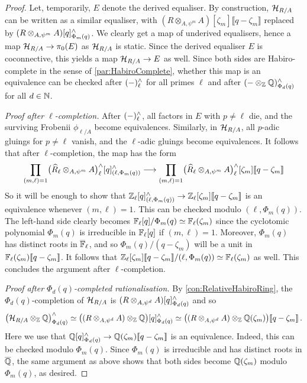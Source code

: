 \documentclass[DIV=12,numbers=enddot,leqno,bibliography=totoc]{scrartcl}
\begin{document}
	\begin{proof}
		Let, temporarily, $E$ denote the derived equaliser. By construction, $\mathcal{H}_{R/A}$ can be written as a similar equaliser, with $(R\otimes_{A,\psi^m}A)[\zeta_m]\llbracket q-\zeta_m\rrbracket$ replaced by $(R\otimes_{A,\psi^m}A)[q]_{\Phi_m(q)}^\wedge$. We clearly get a map of underived equalisers, hence a map $\mathcal{H}_{R/A}\rightarrow \pi_0(E)$ as $\mathcal{H}_{R/A}$ is static. Since the derived equaliser $E$ is coconnective, this yields a map $\mathcal{H}_{R/A}\rightarrow E$ as well. Since both sides are Habiro-complete in the sense of \cref{par:HabiroComplete}, whether this map is an equivalence can be checked after $(-)_\ell^\wedge$ for all primes $\ell$ and after $(-\otimes_{\mathbb{Z}}\mathbb{Q})_{\Phi_d(q)}^\wedge$ for all $d\in\mathbb{N}$.
		
		\emph{Proof after $\ell$-completion.} After $(-)_\ell^\wedge$, all factors in $E$ with $p\neq \ell$ die, and the surviving Frobenii $\phi_{\ell/A}$ become equivalences. Similarly, in $\mathcal{H}_{R/A}$, all $p$-adic gluings for $p\neq \ell$ vanish, and the $\ell$-adic gluings become equivalences. It follows that after $\ell$-completion, the map has the form
		\begin{equation*}
			\prod_{(m,\ell)=1}\bigl(\widehat{R}_\ell\otimes_{A,\psi^m}A\bigr)_\ell^\wedge[q]_{(\ell,\Phi_m(q))}^\wedge\longrightarrow \prod_{(m,\ell)=1}\bigl(\widehat{R}_\ell\otimes_{A,\psi^m}A\bigr)_\ell^\wedge[\zeta_m]\llbracket q-\zeta_m\rrbracket
		\end{equation*}
		So it will be enough to show that $\mathbb{Z}_\ell[q]_{(\ell,\Phi_m(q))}^\wedge\rightarrow \mathbb{Z}_\ell[\zeta_m]\llbracket q-\zeta_m\rrbracket$ is an equivalence whenever $(m,\ell)=1$. This can be checked modulo $(\ell,\Phi_m(q))$. The left-hand side clearly becomes $\mathbb{F}_\ell[q]/\Phi_m(q)\simeq \mathbb{F}_\ell(\zeta_m)$ since the cyclotomic polynomial $\Phi_m(q)$ is irreducible in $\mathbb{F}_\ell[q]$ if $(m,\ell)=1$. Moreover, $\Phi_m(q)$ has distinct roots in $\ov\IF_\ell$, and so $\Phi_m(q)/(q-\zeta_m)$ will be a unit in $\mathbb{F}_\ell(\zeta_m)\llbracket q-\zeta_m\rrbracket$. It follows that $\mathbb{Z}_\ell[\zeta_m]\llbracket q-\zeta_m\rrbracket/(\ell,\Phi_m(q))\simeq \mathbb{F}_\ell(\zeta_m)$ as well. This concludes the argument after $\ell$-completion.
		
		\emph{Proof after $\Phi_d(q)$-completed rationalisation.} By \cref{con:RelativeHabiroRing}, the $\Phi_d(q)$-completion of $\mathcal{H}_{R/A}$ is $(R\otimes_{A,\psi^d}A)[q]_{\Phi_d(q)}^\wedge$ and so
		\begin{equation*}
			\left(\Hh_{R/A}\otimes_\IZ\IQ\right)_{\Phi_d(q)}^\complete\simeq \bigl((R\otimes_{A,\psi^d}A)\otimes_\IZ\IQ\bigr)[q]_{\Phi_d(q)}^\complete\simeq \bigl((R\otimes_{A,\psi^d}A)\otimes_\IZ\IQ(\zeta_m)\bigr)\llbracket q-\zeta_m\rrbracket\,.
		\end{equation*}
		Here we use that $\mathbb{Q}[q]_{\Phi_d(q)}^\wedge\rightarrow \mathbb{Q}(\zeta_m)\llbracket q-\zeta_m\rrbracket$ is an equivalence. Indeed, this can be checked modulo $\Phi_m(q)$. Since $\Phi_m(q)$ is irreducible and has distinct roots in $\ov\IQ$, the same argument as above shows that both sides become $\mathbb{Q}(\zeta_m)$ modulo $\Phi_m(q)$, as desired.
		

\end{proof}
\end{document}
